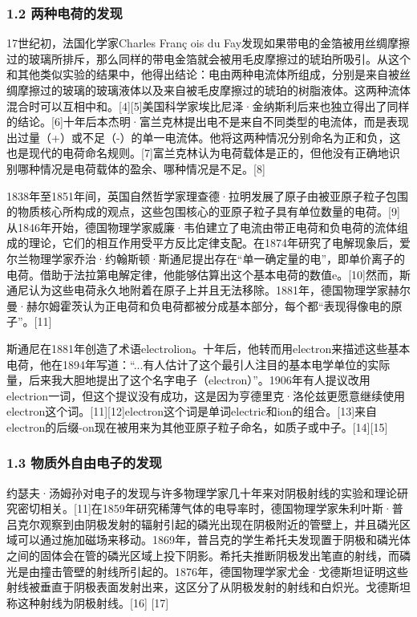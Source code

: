 \subsubsection{1.2 两种电荷的发现}
17世纪初，法国化学家Charles Franç ois du Fay发现如果带电的金箔被用丝绸摩擦过的玻璃所排斥，那么同样的带电金箔就会被用毛皮摩擦过的琥珀所吸引。从这个和其他类似实验的结果中，他得出结论：电由两种电流体所组成，分别是来自被丝绸摩擦过的玻璃的玻璃液体以及来自被毛皮摩擦过的琥珀的树脂液体。这两种流体混合时可以互相中和。[4][5]美国科学家埃比尼泽·金纳斯利后来也独立得出了同样的结论。[6]十年后本杰明·富兰克林提出电不是来自不同类型的电流体，而是表现出过量（+）或不足（-）的单一电流体。他将这两种情况分别命名为正和负，这也是现代的电荷命名规则。[7]富兰克林认为电荷载体是正的，但他没有正确地识别哪种情况是电荷载体的盈余、哪种情况是不足。[8]

1838年至1851年间，英国自然哲学家理查德·拉明发展了原子由被亚原子粒子包围的物质核心所构成的观点，这些包围核心的亚原子粒子具有单位数量的电荷。[9]从1846年开始，德国物理学家威廉·韦伯建立了电流由带正电荷和负电荷的流体组成的理论，它们的相互作用受平方反比定律支配。在1874年研究了电解现象后，爱尔兰物理学家乔治·约翰斯顿·斯通尼提出存在“单一确定量的电”，即单价离子的电荷。借助于法拉第电解定律，他能够估算出这个基本电荷的数值e。[10]然而，斯通尼认为这些电荷永久地附着在原子上并且无法移除。1881年，德国物理学家赫尔曼·赫尔姆霍茨认为正电荷和负电荷都被分成基本部分，每个都“表现得像电的原子”。[11]

斯通尼在1881年创造了术语electrolion。十年后，他转而用electron来描述这些基本电荷，他在1894年写道：“...有人估计了这个最引人注目的基本电学单位的实际量，后来我大胆地提出了这个名字电子（electron）”。1906年有人提议改用electrion一词，但这个提议没有成功，这是因为亨德里克·洛伦兹更愿意继续使用electron这个词。[11][12]electron这个词是单词electric和ion的组合。[13]来自electron的后缀-on现在被用来为其他亚原子粒子命名，如质子或中子。[14][15]
\subsubsection{1.3 物质外自由电子的发现}
约瑟夫·汤姆孙对电子的发现与许多物理学家几十年来对阴极射线的实验和理论研究密切相关。[11]在1859年研究稀薄气体的电导率时，德国物理学家朱利叶斯·普吕克尔观察到由阴极发射的辐射引起的磷光出现在阴极附近的管壁上，并且磷光区域可以通过施加磁场来移动。1869年，普吕克的学生希托夫发现置于阴极和磷光体之间的固体会在管的磷光区域上投下阴影。希托夫推断阴极发出笔直的射线，而磷光是由撞击管壁的射线所引起的。1876年，德国物理学家尤金·戈德斯坦证明这些射线被垂直于阴极表面发射出来，这区分了从阴极发射的射线和白炽光。戈德斯坦称这种射线为阴极射线。[16] [17]

